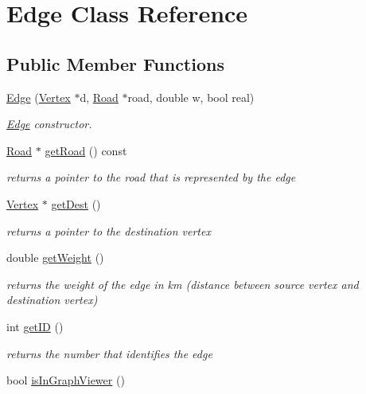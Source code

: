 \hypertarget{class_edge}{}\section{Edge Class Reference}
\label{class_edge}
\subsection*{Public Member Functions}
\begin{DoxyCompactItemize}
\item 
\hyperlink{class_edge_ab1bd2846a532b77ad8ec13c162542a1e}{Edge} (\hyperlink{class_vertex}{Vertex} $\ast$d, \hyperlink{class_road}{Road} $\ast$road, double w, bool real)
\begin{DoxyCompactList}\small\item\em \hyperlink{class_edge}{Edge} constructor. \end{DoxyCompactList}\item 
\hyperlink{class_road}{Road} $\ast$ \hyperlink{class_edge_ae967ccaa1db4dba903ccfb3c55be9bc5}{get\+Road} () const
\begin{DoxyCompactList}\small\item\em returns a pointer to the road that is represented by the edge \end{DoxyCompactList}\item 
\hyperlink{class_vertex}{Vertex} $\ast$ \hyperlink{class_edge_ac3c0ad78f24f90d2d2710472b1164764}{get\+Dest} ()
\begin{DoxyCompactList}\small\item\em returns a pointer to the destination vertex \end{DoxyCompactList}\item 
double \hyperlink{class_edge_a3a776c1ccafacdbdb10fdedd9cb329af}{get\+Weight} ()
\begin{DoxyCompactList}\small\item\em returns the weight of the edge in km (distance between source vertex and destination vertex) \end{DoxyCompactList}\item 
int \hyperlink{class_edge_a871891799480be52268bfe7ba482dcb5}{get\+ID} ()
\begin{DoxyCompactList}\small\item\em returns the number that identifies the edge \end{DoxyCompactList}\item 
bool \hyperlink{class_edge_ad62dd3ff18f1f29d1281625287db21ee}{is\+In\+Graph\+Viewer} ()

\end{DoxyCompactItemize}
